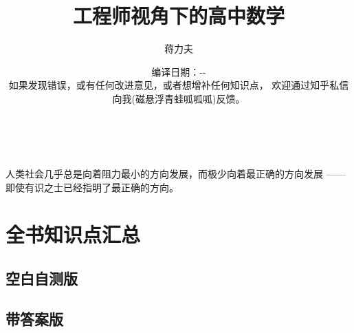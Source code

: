 \documentclass[twoside]{book}
\newif\ifte
\renewcommand{\today}{\number\year-\number\month-\number\day}
\newcommand{\Bookname}{工程师视角下的高中数学}
\begin{document}
​
​
\renewcommand{\theequation}{\thesection.\arabic{equation}}
\columnseprule=0.5pt 

\title{\Bookname}
\author{蒋力夫}
\date{编译日期：\today \\ 
{\scriptsize 如果发现错误，或有任何改进意见，或者想增补任何知识点，
    欢迎通过知乎私信向我(磁悬浮青蛙呱呱呱)反馈。}}

\maketitle

\vspace*{\fill} %
\begin{center}
    {\huge 人类社会几乎总是向着阻力最小的方向发展，而极少向着最正确的方向发展       
        ——即使有识之士已经指明了最正确的方向。}
\end{center}
\vspace*{\fill} %

\cleardoublepage 
 
\tableofcontents

\newpage 


%     
     \pagestyle{fancy} 
        \setcounter{page}{1}
    
    
    
    
    
    
    
     
    
       
    
    
    
    \chapter{全书知识点汇总}
    \tefalse
    \section{空白自测版}
    
    \clearpage
    \tetrue
    \section{带答案版}
    
    \restoregeometry
    
%   
%    
%    
  
\end{document}
